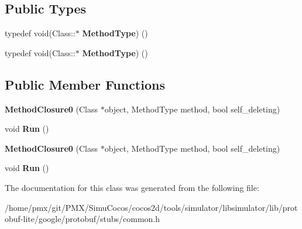 \subsection*{Public Types}
\begin{DoxyCompactItemize}
\item 
\mbox{\label{classgoogle_1_1protobuf_1_1internal_1_1MethodClosure0_ab87a42cd0badbe23f5c53814d40f5702}} 
typedef void(Class\+::$\ast$ {\bfseries Method\+Type}) ()
\item 
\mbox{\label{classgoogle_1_1protobuf_1_1internal_1_1MethodClosure0_ab87a42cd0badbe23f5c53814d40f5702}} 
typedef void(Class\+::$\ast$ {\bfseries Method\+Type}) ()
\end{DoxyCompactItemize}
\subsection*{Public Member Functions}
\begin{DoxyCompactItemize}
\item 
\mbox{\label{classgoogle_1_1protobuf_1_1internal_1_1MethodClosure0_abfaa0932f831b4acb4bce3e183be4286}} 
{\bfseries Method\+Closure0} (Class $\ast$object, Method\+Type method, bool self\+\_\+deleting)
\item 
\mbox{\label{classgoogle_1_1protobuf_1_1internal_1_1MethodClosure0_a517093a6231d70d14177d3a0e2e19cd8}} 
void {\bfseries Run} ()
\item 
\mbox{\label{classgoogle_1_1protobuf_1_1internal_1_1MethodClosure0_abfaa0932f831b4acb4bce3e183be4286}} 
{\bfseries Method\+Closure0} (Class $\ast$object, Method\+Type method, bool self\+\_\+deleting)
\item 
\mbox{\label{classgoogle_1_1protobuf_1_1internal_1_1MethodClosure0_a517093a6231d70d14177d3a0e2e19cd8}} 
void {\bfseries Run} ()
\end{DoxyCompactItemize}


The documentation for this class was generated from the following file\+:\begin{DoxyCompactItemize}
\item 
/home/pmx/git/\+P\+M\+X/\+Simu\+Cocos/cocos2d/tools/simulator/libsimulator/lib/protobuf-\/lite/google/protobuf/stubs/common.\+h\end{DoxyCompactItemize}
